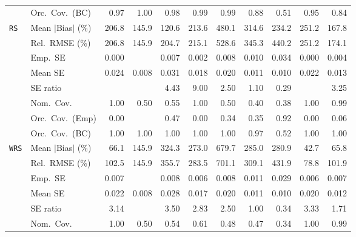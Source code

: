 \begin{landscape}
\begin{longtable}{llrrrrrrrrr}
 & Orc.\ Cov.\ (BC) & \cellcolor{ranktwo}0.97 & 1.00 & \cellcolor{rankthree}0.98 & 0.99 & 0.99 & 0.88 & 0.51 & \cellcolor{rankone}0.95 & 0.84 \\
\addlinespace[2pt]
\quad \texttt{RS} & Mean $|$Bias$|$ (\%) & 206.8 & \cellcolor{ranktwo}145.9 & \cellcolor{rankone}120.6 & 213.6 & 480.1 & 314.6 & 234.2 & 251.2 & \cellcolor{rankthree}167.8 \\
 & Rel.\ RMSE (\%) & 206.8 & \cellcolor{rankone}145.9 & \cellcolor{rankthree}204.7 & 215.1 & 528.6 & 345.3 & 440.2 & 251.2 & \cellcolor{ranktwo}174.1 \\
 & Emp.\ SE & 0.000 &  & 0.007 & 0.002 & 0.008 & 0.010 & 0.034 & 0.000 & 0.004 \\
 & Mean SE & 0.024 & 0.008 & 0.031 & 0.018 & 0.020 & 0.011 & 0.010 & 0.022 & 0.013 \\
 & SE ratio &  &  & 4.43 & 9.00 & \cellcolor{rankthree}2.50 & \cellcolor{rankone}1.10 & \cellcolor{ranktwo}0.29 &  & 3.25 \\
 & Nom.\ Cov. & \cellcolor{ranktwo}1.00 & 0.50 & \cellcolor{rankthree}0.55 & \cellcolor{ranktwo}1.00 & 0.50 & 0.40 & 0.38 & \cellcolor{ranktwo}1.00 & \cellcolor{rankone}0.99 \\
 & Orc.\ Cov.\ (Emp) & 0.00 &  & \cellcolor{ranktwo}0.47 & 0.00 & 0.34 & \cellcolor{rankthree}0.35 & \cellcolor{rankone}0.92 & 0.00 & 0.06 \\
 & Orc.\ Cov.\ (BC) & \cellcolor{ranktwo}1.00 & \cellcolor{ranktwo}1.00 & \cellcolor{ranktwo}1.00 & \cellcolor{ranktwo}1.00 & \cellcolor{ranktwo}1.00 & \cellcolor{rankone}0.97 & \cellcolor{rankthree}0.52 & \cellcolor{ranktwo}1.00 & \cellcolor{ranktwo}1.00 \\
\addlinespace[2pt]
\quad \texttt{WRS} & Mean $|$Bias$|$ (\%) & \cellcolor{rankthree}66.1 & 145.9 & 324.3 & 273.0 & 679.7 & 285.0 & 280.9 & \cellcolor{rankone}42.7 & \cellcolor{ranktwo}65.8 \\
 & Rel.\ RMSE (\%) & \cellcolor{rankthree}102.5 & 145.9 & 355.7 & 283.5 & 701.1 & 309.1 & 431.9 & \cellcolor{rankone}78.8 & \cellcolor{ranktwo}101.9 \\
 & Emp.\ SE & 0.007 &  & 0.008 & 0.006 & 0.008 & 0.011 & 0.029 & 0.006 & 0.007 \\
 & Mean SE & 0.022 & 0.008 & 0.028 & 0.017 & 0.020 & 0.011 & 0.010 & 0.020 & 0.012 \\
 & SE ratio & 3.14 &  & 3.50 & 2.83 & 2.50 & \cellcolor{rankone}1.00 & \cellcolor{ranktwo}0.34 & 3.33 & \cellcolor{rankthree}1.71 \\
 & Nom.\ Cov. & \cellcolor{ranktwo}1.00 & 0.50 & 0.54 & \cellcolor{rankthree}0.61 & 0.48 & 0.47 & 0.34 & \cellcolor{ranktwo}1.00 & \cellcolor{rankone}0.99 \\

\end{longtable}
\end{landscape}

